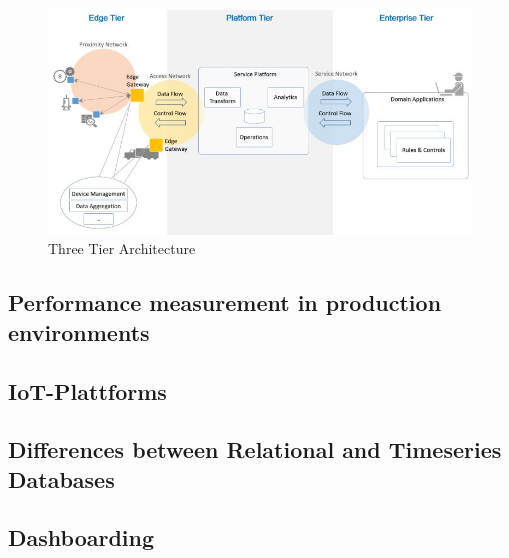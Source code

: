 \begin{figure}[H]
	\includegraphics[width=\linewidth]{pic/three-tier-architecture.jpg}
	\caption{Three Tier Architecture}
	\label{fig:Three-Tier-Architecture}
\end{figure}
\subsection{Performance measurement in production environments}

\subsection{IoT-Plattforms}

\subsection{Differences between Relational and Timeseries Databases}

\subsection{Dashboarding}


